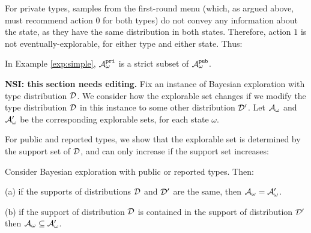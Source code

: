 For private types, samples from the first-round menu (which, as argued above, must recommend action $0$ for both types) do not convey any information about the state, as they have the same distribution in both states. Therefore, action $1$ is not eventually-explorable, for either type and either state.  Thus:

\begin{claim}
	In Example \ref{exp:simple}, $\mathcal{A}_{\omega}^{\mathtt{pri}}$ is a strict subset of $\mathcal{A}_{\omega}^{\mathtt{pub}}$.
\end{claim}

 {\bf NSI: this section needs editing.}
Fix an instance of Bayesian exploration with type distribution $\mathcal{D}$. We consider how the explorable set changes if we modify the type distribution $\mathcal{D}$ in this instance to some other distribution $\mathcal{D}'$. Let $\mathcal{A}_{\omega}$ and $\mathcal{A}_{\omega}'$ be the corresponding explorable sets, for each state $\omega$. 

For public and reported types, we show that the explorable set is determined by the support set of $\mathcal{D}$, and can only increase if the support set increases:

\begin{claim}\label{cl:statics-diversity-public}
Consider Bayesian exploration with public or reported types. Then:
\begin{OneLiners}
\item[(a)] if the supports of distributions $\mathcal{D}$ and $\mathcal{D}'$ are the same, then $\mathcal{A}_{\omega}=\mathcal{A}_{\omega}'$.
\item[(b)] if the support of distribution $\mathcal{D}$ is contained in the support of distribution $\mathcal{D}'$ then $\mathcal{A}_{\omega}\subseteq \mathcal{A}_{\omega}'$.
\end{OneLiners}
\end{claim}


